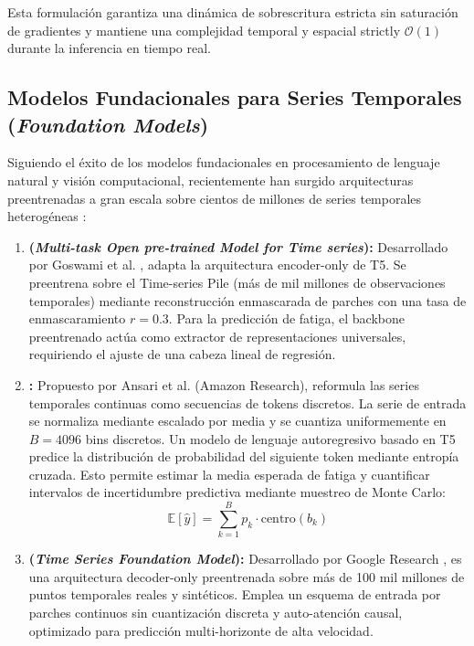 Esta formulación garantiza una dinámica de sobrescritura estricta sin saturación de gradientes y mantiene una complejidad temporal y espacial strictly $\mathcal{O}(1)$ durante la inferencia en tiempo real.

\subsection{Modelos Fundacionales para Series Temporales (\textit{Foundation Models})}

Siguiendo el éxito de los modelos fundacionales en procesamiento de lenguaje natural y visión computacional, recientemente han surgido arquitecturas preentrenadas a gran escala sobre cientos de millones de series temporales heterogéneas \cite{garza2023timegpt, woo2024unified}:

\begin{enumerate}
    \item \textbf{\moment{} (\textit{Multi-task Open pre-trained Model for Time series}):} Desarrollado por Goswami et al. \cite{goswami2024moment}, adapta la arquitectura encoder-only de T5. Se preentrena sobre el Time-series Pile (más de mil millones de observaciones temporales) mediante reconstrucción enmascarada de parches con una tasa de enmascaramiento $r = 0.3$. Para la predicción de fatiga, el backbone preentrenado actúa como extractor de representaciones universales, requiriendo el ajuste de una cabeza lineal de regresión.
    \item \textbf{\chronos{}:} Propuesto por Ansari et al. \cite{ansari2024chronos} (Amazon Research), reformula las series temporales continuas como secuencias de tokens discretos. La serie de entrada se normaliza mediante escalado por media y se cuantiza uniformemente en $B = 4096$ bins discretos. Un modelo de lenguaje autoregresivo basado en T5 predice la distribución de probabilidad del siguiente token mediante entropía cruzada. Esto permite estimar la media esperada de fatiga y cuantificar intervalos de incertidumbre predictiva mediante muestreo de Monte Carlo:
    \begin{equation}
        \mathbb{E}[\hat{y}] = \sum_{k=1}^B p_k \cdot \text{centro}(b_k)
    \end{equation}
    \item \textbf{\timesfm{} (\textit{Time Series Foundation Model}):} Desarrollado por Google Research \cite{das2024decoder}, es una arquitectura decoder-only preentrenada sobre más de 100 mil millones de puntos temporales reales y sintéticos. Emplea un esquema de entrada por parches continuos sin cuantización discreta y auto-atención causal, optimizado para predicción multi-horizonte de alta velocidad.
\end{enumerate}




